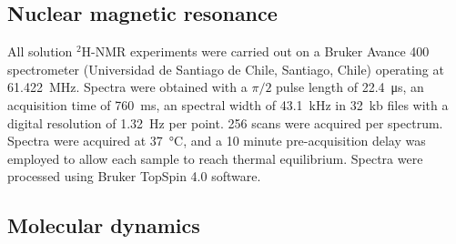 \documentclass[3p,preprint,review]{elsarticle}
\begin{document}
	
	\subsection{Nuclear magnetic resonance}
	\label{sec:method_nmr}
	All solution $^2$H-NMR experiments were carried out on a Bruker Avance 400
	spectrometer (Universidad de Santiago de Chile, Santiago, Chile) operating at
	\SI{61.422}{MHz}. Spectra were obtained with a $\pi/2$ pulse length of
	\SI{22.4}{\micro\second}, an acquisition time of \SI{760}{ms}, an spectral
	width of \SI{43.1}{kHz} in \SI{32}{kb} files with a digital resolution of
	\SI{1.32}{Hz} per point.
	256 scans were acquired per spectrum. Spectra
	were acquired at \SI{37}{\celsius}, and a 10 minute pre-acquisition delay was
	employed to allow each sample to reach thermal equilibrium. Spectra were
	processed
	using Bruker TopSpin 4.0 software.
	
	\subsection{Molecular dynamics}
	
\end{document}
